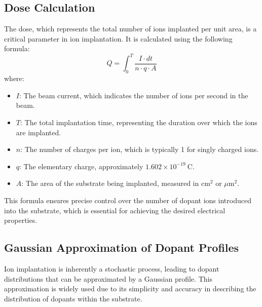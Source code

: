\documentclass{report}
\begin{document}
\subsection{Dose Calculation}
The dose, which represents the total number of ions implanted per unit area, is a critical parameter in ion implantation. It is calculated using the following formula:
$$
Q = \int_{0}^{T} \frac{I \cdot dt}{n \cdot q \cdot A}
$$
where:
\begin{itemize}
    \item $I$: The beam current, which indicates the number of ions per second in the beam.
    \item $T$: The total implantation time, representing the duration over which the ions are implanted.
    \item $n$: The number of charges per ion, which is typically 1 for singly charged ions.
    \item $q$: The elementary charge, approximately $1.602 \times 10^{-19}~\text{C}$.
    \item $A$: The area of the substrate being implanted, measured in $\text{cm}^2$ or $\mu\text{m}^2$.
\end{itemize}
This formula ensures precise control over the number of dopant ions introduced into the substrate, which is essential for achieving the desired electrical properties.

\subsection{Gaussian Approximation of Dopant Profiles}
Ion implantation is inherently a stochastic process, leading to dopant distributions that can be approximated by a Gaussian profile. This approximation is widely used due to its simplicity and accuracy in describing the distribution of dopants within the substrate.
\end{document}
